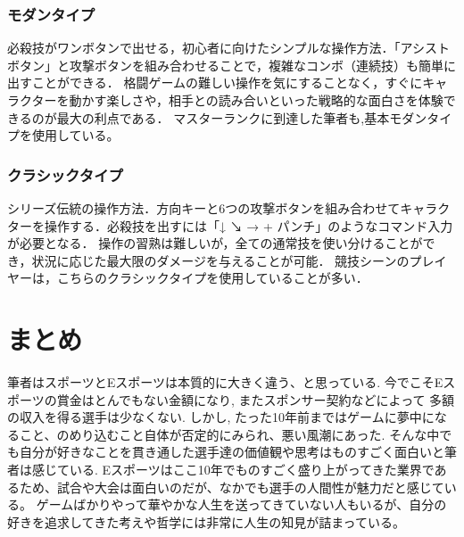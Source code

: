 \documentclass[twocolumn, a4paper]{Zemiresume}
\begin{document}
\subsubsection{モダンタイプ}
必殺技がワンボタンで出せる，初心者に向けたシンプルな操作方法．「アシストボタン」と攻撃ボタンを組み合わせることで，複雑なコンボ（連続技）も簡単に出すことができる．
格闘ゲームの難しい操作を気にすることなく，すぐにキャラクターを動かす楽しさや，相手との読み合いといった戦略的な面白さを体験できるのが最大の利点である．
マスターランクに到達した筆者も,基本モダンタイプを使用している。

\subsubsection{クラシックタイプ}
シリーズ伝統の操作方法．方向キーと6つの攻撃ボタンを組み合わせてキャラクターを操作する．必殺技を出すには「↓ ↘ → + パンチ」のようなコマンド入力が必要となる．
操作の習熟は難しいが，全ての通常技を使い分けることができ，状況に応じた最大限のダメージを与えることが可能．
競技シーンのプレイヤーは，こちらのクラシックタイプを使用していることが多い．


\section{まとめ}
筆者はスポーツとEスポーツは本質的に大きく違う、と思っている. 今でこそEスポーツの賞金はとんでもない金額になり, またスポンサー契約などによって
多額の収入を得る選手は少なくない. しかし, たった10年前まではゲームに夢中になること、のめり込むこと自体が否定的にみられ、悪い風潮にあった.
そんな中でも自分が好きなことを貫き通した選手達の価値観や思考はものすごく面白いと筆者は感じている.
Eスポーツはここ10年でものすごく盛り上がってきた業界であるため、試合や大会は面白いのだが、なかでも選手の人間性が魅力だと感じている。
ゲームばかりやって華やかな人生を送ってきていない人もいるが、自分の好きを追求してきた考えや哲学には非常に人生の知見が詰まっている。

{\small


}
\end{document}
